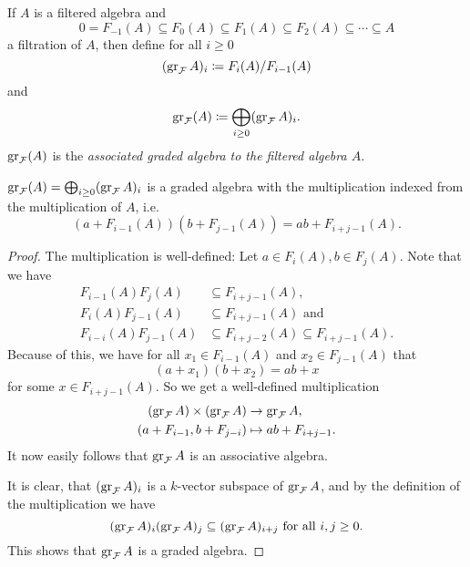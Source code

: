 \begin{defi}
 If $A$ is a filtered algebra and
 \[
  0 = F_{-1}(A) \subseteq F_0(A) \subseteq F_1(A) \subseteq F_2(A) \subseteq \dotsb \subseteq A
 \]
 a filtration of $A$, then define for all $i \geq 0$
 \[
  (\operatorname{gr}_\mathcal{F}A)_i \coloneqq F_i(A)/F_{i-1}(A)
 \]
 and
 \[
  \operatorname{gr}_\mathcal{F}(A) \coloneqq \bigoplus_{i \geq 0} (\operatorname{gr}_\mathcal{F}A)_i.
 \]
 $\operatorname{gr}_\mathcal{F}(A)$ is the \emph{associated graded algebra to the filtered algebra $A$}.
\end{defi}



\begin{lem}
 $\operatorname{gr}_\mathcal{F}(A) = \bigoplus_{i \geq 0} (\operatorname{gr}_\mathcal{F}A)_i$ is a graded algebra with the multiplication indexed from the multiplication of $A$, i.e.
 \[
  ( a + F_{i-1}(A) )( b + F_{j-1}(A) ) = ab + F_{i+j-1}(A).
 \]
\end{lem}
\begin{proof}
 The multiplication is well-defined: Let $a \in F_i(A), b \in F_j(A)$. Note that we have
 \begin{align*}
  F_{i-1}(A)F_j(A) &\subseteq F_{i+j-1}(A), \\
  F_i(A) F_{j-1}(A) &\subseteq F_{i+j-1}(A) \text{ and } \\
  F_{i-i}(A)F_{j-1}(A) &\subseteq F_{i+j-2}(A) \subseteq F_{i+j-1}(A).
 \end{align*}
 Because of this, we have for all $x_1 \in F_{i-1}(A)$ and $x_2 \in F_{j-1}(A)$ that
 \[
  (a + x_1)(b + x_2) = a b + x
 \]
 for some $x \in F_{i+j-1}(A)$. So we get a well-defined multiplication
 \begin{align*}
  (\operatorname{gr}_\mathcal{F} A) \times (\operatorname{gr}_\mathcal{F} A) &\to \operatorname{gr}_\mathcal{F} A, \\
  (a + F_{i-1}, b + F_{j-i}) &\mapsto ab + F_{i+j-1}.
 \end{align*}
 It now easily follows that $\operatorname{gr}_\mathcal{F} A$ is an associative algebra.
 
 It is clear, that $(\operatorname{gr}_\mathcal{F} A)_i$ is a $k$-vector subspace of $\operatorname{gr}_\mathcal{F} A$, and by the definition of the multiplication we have
 \[
  (\operatorname{gr}_\mathcal{F} A)_i (\operatorname{gr}_\mathcal{F} A)_j \subseteq (\operatorname{gr}_\mathcal{F} A)_{i+j} \text{ for all } i,j \geq 0.
 \]
 This shows that $\operatorname{gr}_\mathcal{F} A$ is a graded algebra.
\end{proof}


